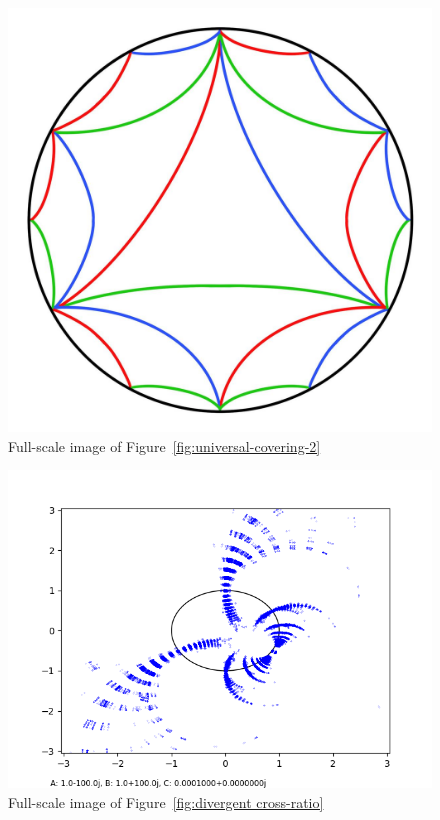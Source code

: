 \documentclass[12pt,a4paper,reqno,parskip=full]{amsart}
\numberwithin{equation}{section}
\theoremstyle{plain}
\theoremstyle{definition}
\begin{document}
\begin{figure}[H]
    \centering
    \includegraphics[width=\textwidth]{images/RS colored detailed 2.jpg}
    \caption{Full-scale image of Figure~\ref{fig:universal-covering-2}}
\end{figure}

\begin{figure}[H]
    \centering
    \includegraphics[width=\textwidth]{nn/a-100 b100 h40 d0.025}
    \caption{Full-scale image of Figure~\ref{fig:divergent cross-ratio}}
\end{figure}
\end{document}
